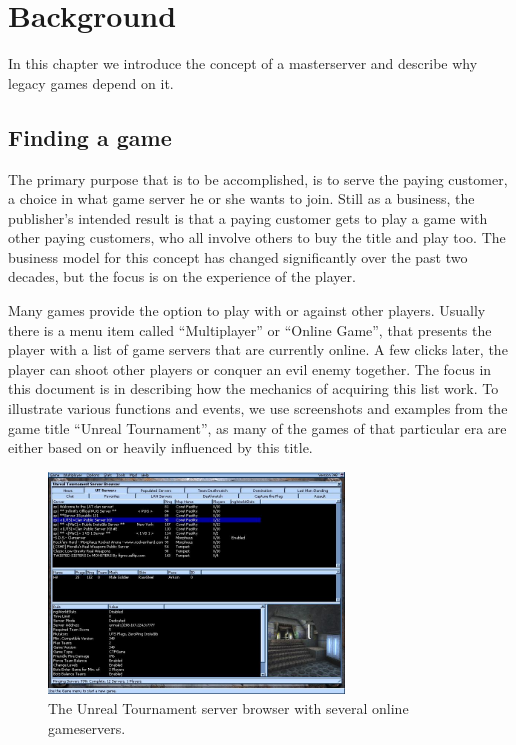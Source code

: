 \chapter{Background}
\label{chap:bg}

In this chapter we introduce the concept of a masterserver and describe why legacy games depend on it.

\section{Finding a game}
The primary purpose that is to be accomplished, is to serve the paying customer, a choice in what game server he or she wants to join. Still as a business, the publisher's intended result is that a paying customer gets to play a game with other paying customers, who all involve others to buy the title and play too. The business model for this concept has changed significantly over the past two decades, but the focus is on the experience of the player.

Many games provide the option to play with or against other players. Usually there is a menu item called ``Multiplayer'' or ``Online Game'', that presents the player with a list of game servers that are currently online. A few clicks later, the player can shoot other players or conquer an evil enemy together. The focus in this document is in describing how the mechanics of acquiring this list work. To illustrate various functions and events, we use screenshots and examples from the game title ``Unreal Tournament'', as many of the games of that particular era are either based on or heavily influenced by this title.

\begin{figure}[h]
\centering
\includegraphics[width=0.7\textwidth]{./img/ubrowser}
\caption{The Unreal Tournament server browser with several online gameservers.}
\label{fig:ubrowser}
\end{figure}

